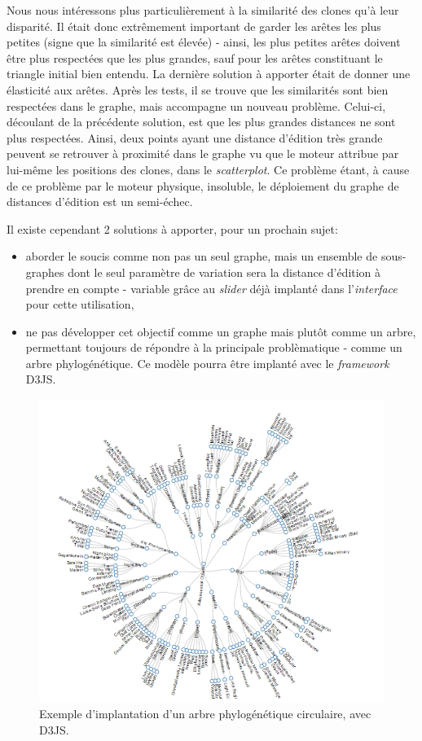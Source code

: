 \documentclass[pdftex,12pt,a4paper]{report}
\begin{document}
\begin{spacing}{1.2}
Nous nous intéressons plus particulièrement à la similarité des clones qu'à leur disparité. Il était donc extrêmement important de garder les arêtes les plus petites (signe que la similarité est élevée) - ainsi, les plus petites arêtes doivent être plus respectées que les plus grandes, sauf pour les arêtes constituant le triangle initial bien entendu. La dernière solution à apporter était de donner une élasticité aux arêtes. Après les tests, il se trouve que les similarités sont bien respectées dans le graphe, mais accompagne un nouveau problème. Celui-ci, découlant de la précédente solution, est que les plus grandes distances ne sont plus respectées. Ainsi, deux points ayant une distance d'édition très grande peuvent se retrouver à proximité dans le graphe vu que le moteur attribue par lui-même les positions des clones, dans le \textit{scatterplot}. Ce problème étant, à cause de ce problème par le moteur physique, insoluble, le déploiement du graphe de distances d'édition est un semi-échec.

Il existe cependant 2 solutions à apporter, pour un prochain sujet:
\begin{itemize}
\item{aborder le soucis comme non pas un seul graphe, mais un ensemble de sous-graphes dont le seul paramètre de variation sera la distance d'édition à prendre en compte - variable grâce au \textit{slider} déjà implanté dans l'\textit{interface} pour cette utilisation,}
\item{ne pas développer cet objectif comme un graphe mais plutôt comme un arbre, permettant toujours de répondre à la principale problèmatique - comme un arbre phylogénétique. Ce modèle pourra être implanté avec le \textit{framework} D3JS.}
\end{itemize}

\begin{figure}[H]
\begin{center}
	\includegraphics[scale=0.6]{img/phylogenetic_tree_d3js.png}
\end{center}
\caption{Exemple d'implantation d'un arbre phylogénétique circulaire, avec D3JS.}
\end{figure}


\end{spacing}
\end{document}
